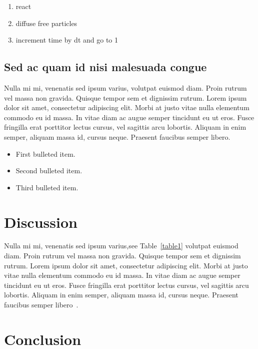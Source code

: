 \documentclass[
  10pt,
  letterpaper,
]{article}
\begin{document}
\begin{enumerate}
\def\labelenumi{\arabic{enumi}.}
\item
  react
\item
  diffuse free particles
\item
  increment time by dt and go to 1
\end{enumerate}

\hypertarget{sed-ac-quam-id-nisi-malesuada-congue}{%
\subsection{Sed ac quam id nisi malesuada
congue}\label{sed-ac-quam-id-nisi-malesuada-congue}}

Nulla mi mi, venenatis sed ipsum varius, volutpat euismod diam. Proin
rutrum vel massa non gravida. Quisque tempor sem et dignissim rutrum.
Lorem ipsum dolor sit amet, consectetur adipiscing elit. Morbi at justo
vitae nulla elementum commodo eu id massa. In vitae diam ac augue semper
tincidunt eu ut eros. Fusce fringilla erat porttitor lectus cursus, vel
sagittis arcu lobortis. Aliquam in enim semper, aliquam massa id, cursus
neque. Praesent faucibus semper libero.

\begin{itemize}
\item
  First bulleted item.
\item
  Second bulleted item.
\item
  Third bulleted item.
\end{itemize}

\hypertarget{discussion}{%
\section{Discussion}\label{discussion}}

Nulla mi mi, venenatis sed ipsum varius,see Table~\ref{table1} volutpat
euismod diam. Proin rutrum vel massa non gravida. Quisque tempor sem et
dignissim rutrum. Lorem ipsum dolor sit amet, consectetur adipiscing
elit. Morbi at justo vitae nulla elementum commodo eu id massa. In vitae
diam ac augue semper tincidunt eu ut eros. Fusce fringilla erat
porttitor lectus cursus, vel sagittis arcu lobortis. Aliquam in enim
semper, aliquam massa id, cursus neque. Praesent faucibus semper
libero~\citep{bib3}.

\hypertarget{conclusion}{%
\section{Conclusion}\label{conclusion}}
\end{document}
